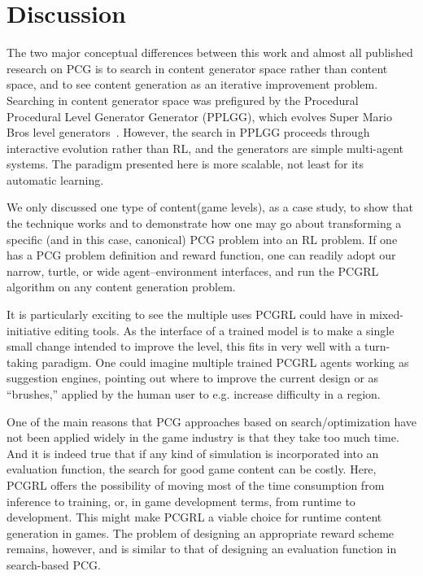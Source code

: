 \documentclass[letterpaper]{article} %
\begin{document}
\section{Discussion}

The two major conceptual differences between this work and almost all published research on PCG is to search in content generator space rather than content space, and to see content generation as an iterative improvement problem. Searching in content generator space was prefigured by the Procedural Procedural Level Generator Generator (PPLGG), which evolves Super Mario Bros level generators~\cite{kerssemakers2012procedural}. However, the search in PPLGG proceeds through interactive evolution rather than RL, and the generators are simple multi-agent systems. The paradigm presented here is more scalable, not least for its automatic learning. %

We only discussed one type of content(game levels), as a case study, to show that the technique works and to demonstrate how one may go about transforming a specific (and in this case, canonical) PCG problem into an RL problem. If one has a PCG problem definition and reward function, one can readily adopt our narrow, turtle, or wide agent–environment interfaces, and run the PCGRL algorithm on any content generation problem.

It is particularly exciting to see the multiple uses PCGRL could have in mixed-initiative editing tools. As the interface of a trained model is to make a single small change intended to improve the level, this fits in very well with a turn-taking paradigm. One could imagine multiple trained PCGRL agents working as suggestion engines, pointing out where to improve the current design or as ``brushes,'' applied by the human user to e.g. increase difficulty in a region.

One of the main reasons that PCG approaches based on search/optimization have not been applied widely in the game industry is that they take too much time. And it is indeed true that if any kind of simulation is incorporated into an evaluation function, the search for good game content can be costly. Here, PCGRL offers the possibility of moving most of the time consumption from inference to training, or, in game development terms, from runtime to development. This might make PCGRL a viable choice for runtime content generation in games. 
The problem of designing an appropriate reward scheme remains, however, and is similar to that of designing an evaluation function in search-based PCG. 
\end{document}
